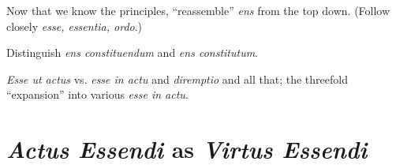 \begin{DONE}

Now that we know the principles, \enquote{reassemble} \emph{ens} from the top down. (Follow closely \emph{esse, essentia, ordo}.)

Distinguish \emph{ens constituendum} and \emph{ens constitutum}.

\emph{Esse ut actus} vs. \emph{esse in actu} and \emph{diremptio} and all that; the threefold \enquote{expansion} into various \emph{esse in actu}.

\end{DONE}

\section{\emph{Actus Essendi} as \emph{Virtus Essendi} }
\label{sec:virtus-essendi}

